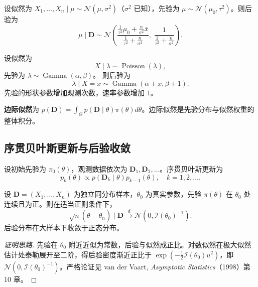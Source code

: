 \begin{example}[正态-正态共轭模型]\label{ex:normal_normal}
设似然为 $X_1, \dots, X_n \mid \mu \sim \mathcal{N}(\mu, \sigma^2)$（$\sigma^2$ 已知），先验为 $\mu \sim \mathcal{N}(\mu_0, \tau^2)$。则后验为
\[
\mu \mid \mathbf{D} \sim \mathcal{N}\left( \frac{\frac{1}{\tau^2}\mu_0 + \frac{n}{\sigma^2}\bar{x}}{\frac{1}{\tau^2} + \frac{n}{\sigma^2}}, \; \frac{1}{\frac{1}{\tau^2} + \frac{n}{\sigma^2}} \right).
\]
\end{example}

\begin{example}[伽马–泊松共轭模型]
\label{ex:gamma_poisson}
设似然为
\[
X \mid \lambda \sim \operatorname{Poisson}(\lambda),
\]
先验为 $\lambda \sim \operatorname{Gamma}(\alpha, \beta)$。
则后验为
\[
\lambda \mid X = x \sim \operatorname{Gamma}(\alpha + x, \beta + 1).
\]
先验的形状参数增加观测次数，速率参数增加 $1$。
\end{example}

\begin{definition}[边际似然]\label{def:marginal_likelihood}
\textbf{边际似然}为 $p(\mathbf{D}) = \int_{\Theta} p(\mathbf{D} \mid \theta) \pi(\theta) d\theta$。边际似然是先验分布与似然权重的整体积分。
\end{definition}

\subsection{序贯贝叶斯更新与后验收敛}

\begin{definition}[序贯贝叶斯更新]\label{def:sequential_bayesian}
设初始先验为 $\pi_0(\theta)$，观测数据依次为 $\mathbf{D}_1, \mathbf{D}_2, \dots$。序贯贝叶斯更新为
\[
p_k(\theta) \propto p(\mathbf{D}_k \mid \theta) p_{k-1}(\theta), \quad k = 1, 2, \dots.
\]
\end{definition}

\begin{theorem}\label{thm:bernstein_von_mises}
设 $\mathbf{D} = (X_1, \dots, X_n)$ 为独立同分布样本，$\theta_0$ 为真实参数，先验 $\pi(\theta)$ 在 $\theta_0$ 处连续且为正。则在适当正则条件下，
\[
\sqrt{n}(\theta - \hat{\theta}_n) \mid \mathbf{D} \xrightarrow{d} \mathcal{N}(0, \mathcal{I}(\theta_0)^{-1}).
\]
后验分布在大样本下收敛于正态分布。
\end{theorem}

\begin{proof}[证明思路]
先验在 $\theta_0$ 附近近似为常数，后验与似然成正比。对数似然在极大似然估计处泰勒展开至二阶，得后验密度渐近正比于 $\exp(-\tfrac12 \mathcal{I}(\theta_0) u^2)$，即 $\mathcal{N}(0, \mathcal{I}(\theta_0)^{-1})$。严格论证见 van der Vaart, \emph{Asymptotic Statistics}（1998）第 10 章。
\end{proof}

